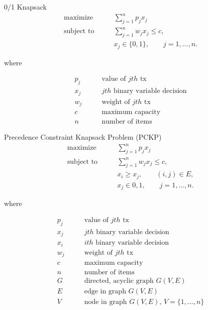 \documentclass{article}
\begin{document}
0/1 Knapsack \\
\begin{align}
    \text{maximize} \qquad   &\sum_{j=1}^n p_j x_j \\
    \text{subject to} \qquad &\sum_{j=1}^n w_j x_j \leq c, \\
                             &x_j \in \{0, 1\}, \qquad j=1,...,n.
\end{align}

where

\begin{align*}
    p_j &\qquad \text{value of $jth$ tx} \\
    x_j &\qquad \text{$jth$ binary variable decision} \\
    w_j &\qquad \text{weight of $jth$ tx} \\
    c   &\qquad \text{maximum capacity} \\
    n   &\qquad \text{number of items}
\end{align*}


Precedence Constraint Knapsack Problem (PCKP) \\

\begin{align}
    \text{maximize} \qquad   &\sum_{j=1}^n p_j x_j \\
    \text{subject to} \qquad &\sum_{j=1}^n w_j x_j \leq c, \\
                             &x_i \geq x_j, \qquad (i,j) \in E, \\
                             &x_j \in {0, 1}, \qquad j=1,...,n.
\end{align}

where

\begin{align*}
    p_j &\qquad \text{value of $jth$ tx} \\
    x_j &\qquad \text{$jth$ binary variable decision} \\
    x_i &\qquad \text{$ith$ binary variable decision} \\
    w_j &\qquad \text{weight of $jth$ tx} \\
    c   &\qquad \text{maximum capacity} \\
    n   &\qquad \text{number of items} \\
    G   &\qquad \text{directed, acyclic graph $G(V,E)$} \\
    E   &\qquad \text{edge in graph $G(V,E)$} \\
    V   &\qquad \text{node in graph $G(V,E)$, $V=\{1,...,n\}$}
\end{align*}
\end{document}
